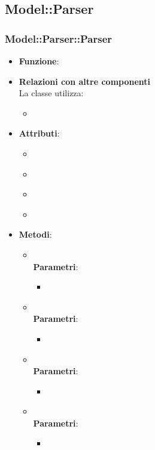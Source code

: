 \subsection{Model::Parser}
\subsubsection{Model::Parser::Parser}
\begin{itemize}
\item\textbf{Funzione}:
\item\textbf{Relazioni con altre componenti}\\
La classe utilizza:
	\begin{itemize}
		\item
	\end{itemize}
\item\textbf{Attributi}:
	\begin{itemize}
		\item\code{}\\
		\item\code{}\\
		\item\code{}\\
		\item\code{}\\
	\end{itemize}
\item\textbf{Metodi}:
	\begin{itemize}
		\item\code{}\\
		\textbf{Parametri}:
			\begin{itemize}
				\item\code{}\\
			\end{itemize}
		\item\code{}\\
		\textbf{Parametri}:
			\begin{itemize}
				\item\code{}\\
			\end{itemize}
		\item\code{}\\
		\textbf{Parametri}:
			\begin{itemize}
				\item\code{}\\
			\end{itemize}
		\item\code{}\\
		\textbf{Parametri}:
			\begin{itemize}
				\item\code{}\\
			\end{itemize}
	\end{itemize}
\end{itemize}

